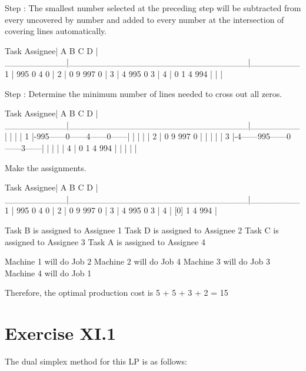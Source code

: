 \documentclass[titlepage, letterpaper]{article}
\begin{document}
\begin{lslisting}
Step :
The smallest number selected at the preceding step will be subtracted from every uncovered by 
number and added to every number at the intersection of covering lines automatically. 

                       Task
  Assignee| A      B      C      D      |
__________|_____________________________|________
     1    | 995    0      4      0      | 
     2    | 0      9      997    0      | 
     3    | 4      995    0      3      | 
     4    | 0      1      4      994    | 
          |                             | 

Step :
Determine the minimum number of lines needed to cross out all zeros.

                       Task
  Assignee| A      B      C      D      |
__________|_____________________________|________
          | |                    |      |
     1    |-995------0------4------0------|
          | |                    |      |
     2    | 0      9      997    0      |
          | |                    |      |
     3    |-4------995------0------3------|
          | |                    |      |
     4    | 0      1      4      994    |
          | |                    |      |

Make the assignments.

                       Task
  Assignee| A      B      C      D      |
__________|_____________________________|________
     1    | 995    0      4      0      | 
     2    | 0      9      997    0      | 
     3    | 4      995    0      3      | 
     4    | [0]    1      4      994    | 

Task B is assigned to Assignee 1
Task D is assigned to Assignee 2
Task C is assigned to Assignee 3
Task A is assigned to Assignee 4

Machine 1 will do Job 2
Machine 2 will do Job 4
Machine 3 will do Job 3
Machine 4 will do Job 1

Therefore, the optimal production cost is
5 + 5 + 3 + 2 = 15
\end{lslisting}


\section{Exercise XI.1} %
\label{sec:exercise}

The dual simplex method for this LP is as follows:
\end{document}

